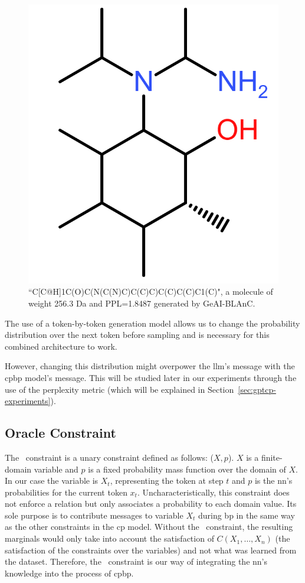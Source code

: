 \documentclass[../Document.tex]{subfiles}
\begin{document}
\begin{figure}[t]
    \centering
    \includegraphics[width=0.25\columnwidth]
    {images/example_molecule.png}
    \caption{``C[C@H]1C(O)C(N(C(N)C)C(C)C)C(C)C(C)C1(C)", a molecule of weight  256.3 Da and PPL=1.8487
    generated by GeAI-BLAnC.} %
    \label{fig:combined-model-molecule}
\end{figure}

The use of a token-by-token generation model allows us to change the probability distribution over the next token before sampling and is necessary for this combined architecture to work.

However, changing this distribution might overpower the \gls{llm}'s message with the \gls{cpbp} model's message. This will be studied later in our experiments through the use of the perplexity metric (which will be explained in Section~\ref{sec:gptcp-experiments}).


\subsection{Oracle Constraint}
\label{sec:oracle-constraint}
The \oracle\ constraint is a unary constraint defined as follows: \oracle($X,p$). $X$ is a finite-domain variable and $p$ is a fixed probability mass function over the domain of $X$.
In our case the variable is $X_t$, representing the token at step $t$ and $p$ is the \gls{nn}'s probabilities for the current token $x_t$.
Uncharacteristically, this constraint does not enforce a relation but only associates a probability to each domain value.
Its sole purpose is to contribute messages to variable $X_t$ during \gls{bp} in the same way as the other constraints in the \gls{cp} model.
Without the \oracle\ constraint, the resulting marginals would only take into account the satisfaction of $C(X_1,\ldots,X_n)$ (\ie the satisfaction of the constraints over the variables) and not what was learned from the dataset.
Therefore, the \oracle\ constraint is our way of integrating the \gls{nn}'s knowledge into the process of \gls{cpbp}.
\end{document}
